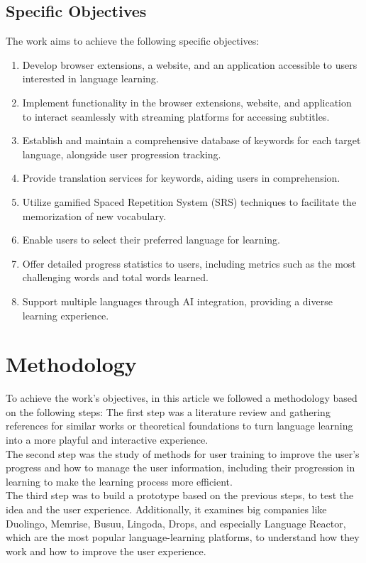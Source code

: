 \documentclass[12pt]{article}
\begin{document}
\subsection{Specific Objectives}
The work aims to achieve the following specific objectives:

\begin{enumerate}
\item Develop browser extensions, a website, and an application accessible to users interested in language learning.
\item Implement functionality in the browser extensions, website, and application to interact seamlessly with streaming platforms for accessing subtitles.
\item Establish and maintain a comprehensive database of keywords for each target language, alongside user progression tracking.
\item Provide translation services for keywords, aiding users in comprehension.
\item Utilize gamified Spaced Repetition System (SRS) techniques to facilitate the memorization of new vocabulary.
\item Enable users to select their preferred language for learning.
\item Offer detailed progress statistics to users, including metrics such as the most challenging words and total words learned.
\item Support multiple languages through AI integration, providing a diverse learning experience.
\end{enumerate}


\section{Methodology}
To achieve the work's objectives, in this article we followed a methodology based on the following steps:
The first step was a literature review and gathering references for similar works or theoretical foundations to turn language learning into a more playful and interactive experience. \\
The second step was the study of methods for user training to improve the user's progress and how to manage the user information, including their progression in learning to make the learning process more efficient. \\
The third step was to build a prototype based on the previous steps, to test the idea and the user experience. 
Additionally, it examines big companies like Duolingo, Memrise, Busuu, Lingoda, Drops, and especially Language Reactor, which are the most popular language-learning platforms, to understand how they work and how to improve the user experience. \\
\end{document}
